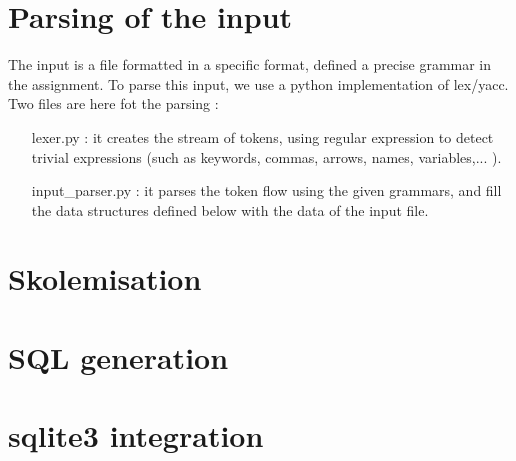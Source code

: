 \documentclass[a4paper,11pt]{article}
\begin{document}
\section{Parsing of the input}
The input is a file formatted in a specific format, defined a precise grammar in the assignment. To parse this input, we use a python implementation of lex/yacc. Two files are here fot the parsing :
\begin{itemize} 
  \item [lexer.py] : it creates the stream of tokens, using regular expression to detect trivial expressions (such as keywords, commas, arrows, names, variables,... ). 
  \item [input\_parser.py] : it parses the token flow using the given grammars, and fill the data structures defined below with the data of the input file. 
\end{itemize} 

\section{Skolemisation}
\section{SQL generation}
\section{sqlite3 integration}
\end{document}
